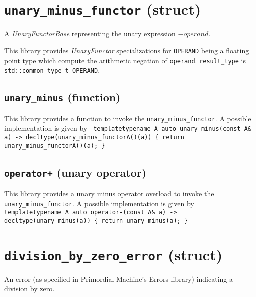 \documentclass[oneside]{book}
\begin{document}
\section{\texttt{unary\_minus\_functor} (struct)}
A \textit{UnaryFunctorBase} representing the unary expression $-\textit{operand}$.\newline

\noindent{}This library provides \textit{UnaryFunctor}            specializations for
\texttt{OPERAND} being a floating point type which compute the arithmetic    negation
of \texttt{operand}. \texttt{result\_type} is \texttt{std::common\_type\_t\textlangle
OPERAND\textrangle}.

\subsection{\texttt{unary\_minus} (function)}
This library provides a function to invoke the \texttt{unary\_minus\_functor}.
A possible implementation is given by\newline
\texttt{
template\textlangle typename A\textrangle\newline
auto unary\_minus(const A\& a) -> decltype(unary\_minus\_functor\textlangle A\textrangle()(a))\newline
\{ return unary\_minus\_functor\textlangle A\textrangle()(a); \}
}

\subsection{\texttt{operator+} (unary operator)}
This library provides a unary minus operator overload to invoke the \texttt{unary\_minus\_functor}.
A possible implementation is given by\newline
\texttt{
template\textlangle typename A\textrangle\newline
auto operator-(const A\& a) -> decltype(unary\_minus(a))\newline
\{ return unary\_minus(a); \}
}





\section{\texttt{division\_by\_zero\_error} (struct)}
An error (as specified in Primordial Machine's Errors library) indicating a division by zero.
\end{document}
